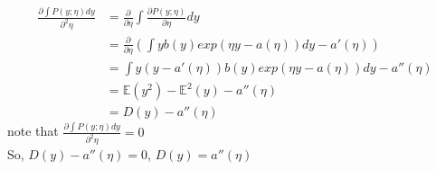 \begin{answer}
\begin{align*}
    \frac{\partial \int P(y; \eta) dy}{\partial^2 \eta} &= \frac{\partial}{\partial \eta}\int \frac{\partial P(y;\eta)}{\partial \eta} dy\\
    &= \frac{\partial}{\partial \eta}(\int y b(y) exp(\eta y - a(\eta)) dy - a'(\eta))\\
    &= \int y(y - a'(\eta))b(y)exp(\eta y - a(\eta)) dy - a''(\eta)\\
    &= \mathbb{E}(y^2) - \mathbb{E}^2(y) - a''(\eta)\\
    &= D(y) - a''(\eta)
\end{align*}
note that $\frac{\partial \int P(y; \eta) dy}{\partial^2 \eta} = 0$\\
So, $D(y) - a''(\eta) = 0$, $D(y) = a''(\eta)$
\end{answer}
